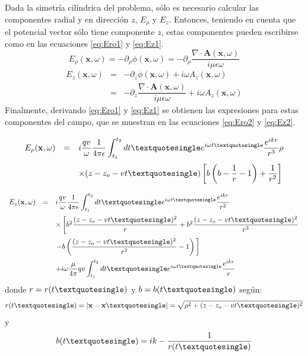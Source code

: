 Dada la simetr\'ia cil\'indrica del problema, s\'olo es necesario calcular las componentes radial y en direcci\'on $z$, $E_\rho$ y $E_z$.
Entonces, teniendo en cuenta que el potencial vector s\'olo tiene componente $z$, estas componentes pueden escribirse como en las ecuaciones \ref{eq:Ero1} y \ref{eq:Ez1}.
%
\begin{equation}
E_\rho(\mathbf{x},\omega)=
-\partial_\rho\phi(\mathbf{x},\omega)
=
-\partial_\rho\frac{\nabla\cdot\mathbf{A}(\mathbf{x},\omega)}{i\mu\epsilon\omega}
\label{eq:Ero1}
\end{equation}
%
\begin{equation}
	\renewcommand{\arraystretch}{2.5}
	\begin{array}{rcl}
	E_z(\mathbf{x},\omega)& = & 
	-\partial_z\phi(\mathbf{x},\omega) + i\omega A_z(\mathbf{x},\omega)\\
	& = &
	-\partial_z\dfrac{\nabla\cdot\mathbf{A}(\mathbf{x},\omega)}{i\mu\epsilon\omega}
	+ i\omega A_z(\mathbf{x},\omega)
	\end{array}
\label{eq:Ez1}
\end{equation}
%
Finalmente, derivando \ref{eq:Ero1} y \ref{eq:Ez1} se obtienen las expresiones para estas componentes del campo, que se muestran en las ecuaciones \ref{eq:Ero2} y \ref{eq:Ez2}.
%
\begin{equation}
	\renewcommand{\arraystretch}{2.5}
	\begin{array}{rcl}
	E_\rho(\mathbf{x},\omega)& = & 
	i\dfrac{qv}{\omega}\dfrac{1}{4\pi\epsilon}
	\displaystyle\int_{t_1}^{t_2}dt\textquotesingle
	e^{i\omega t\textquotesingle}\dfrac{e^{ikr}}{r^3}\rho\\
	&&\times
	(z-z_o-vt\textquotesingle)
	\left[
		b\left(
			b-\dfrac{1}{r}-1
		\right)
		+\dfrac{1}{r^2}
	\right]\\
	\end{array}
\label{eq:Ero2}
\end{equation}
%
\begin{equation}
	\renewcommand{\arraystretch}{2.5}
	\begin{array}{rcl}
	E_z(\mathbf{x},\omega)& = & 
	i\dfrac{qv}{\omega}\dfrac{1}{4\pi\epsilon}
	\displaystyle\int_{t_1}^{t_2}dt\textquotesingle
	e^{i\omega t\textquotesingle}\dfrac{e^{ikr}}{r^2}\\
	&&\times
	\left[
		b^2\dfrac{(z-z_o-vt\textquotesingle)^2}{r}
		+
		b^2\dfrac{(z-z_o-vt\textquotesingle)^2}{r^3}
		\right.
		\\
		&&
		\left.
		-b\left(
			\dfrac{(z-z_o-vt\textquotesingle)^2}{r^2}-1
		\right)\,
	\right]\\
	&&+
	i\omega\dfrac{\mu}{4\pi}qv
	\displaystyle\int_{t_1}^{t_2}dt\textquotesingle
	e^{i\omega t\textquotesingle}\dfrac{e^{ikr}}{r}
	\end{array}
\label{eq:Ez2}
\end{equation}
%
donde $r=r(t\textquotesingle)$ y $b=b(t\textquotesingle)$ seg\'un:
%
\begin{equation}
r(t\textquotesingle)
= |\mathbf{x}-\mathbf{x}\textquotesingle|
= \sqrt{\rho^2+(z-z_o-vt\textquotesingle)^2}
\end{equation}
%
y
%
\begin{equation}
b(t\textquotesingle) = ik-\dfrac{1}{r(t\textquotesingle)}
\end{equation}

